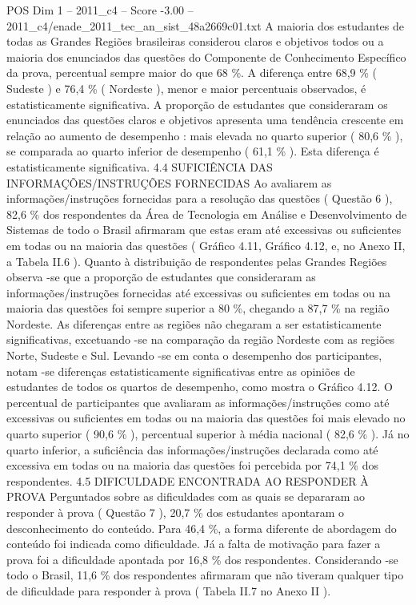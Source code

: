 \begin{textsample}{POS Dim 1 – 2011\_c4 – Score -3.00 – 2011\_c4/enade\_2011\_tec\_an\_sist\_48a2669c01.txt}
A maioria dos estudantes de todas as Grandes Regiões brasileiras considerou claros e objetivos todos ou a maioria dos enunciados das questões do Componente de Conhecimento Específico da prova, percentual sempre maior do que 68 \%.
A diferença entre 68,9 \% ( Sudeste ) e 76,4 \% ( Nordeste ), menor e maior percentuais observados, é estatisticamente significativa.
A proporção de estudantes que consideraram os enunciados das questões claros e objetivos apresenta uma tendência crescente em relação ao aumento de desempenho : mais elevada no quarto superior ( 80,6 \% ), se comparada ao quarto inferior de desempenho ( 61,1 \% ).
Esta diferença é estatisticamente significativa. 4.4 SUFICIÊNCIA DAS INFORMAÇÕES/INSTRUÇÕES FORNECIDAS Ao avaliarem as informações/instruções fornecidas para a resolução das questões ( Questão 6 ), 82,6 \% dos respondentes da Área de Tecnologia em Análise e Desenvolvimento de Sistemas de todo o Brasil afirmaram que estas eram até excessivas ou suficientes em todas ou na maioria das questões ( Gráfico 4.11, Gráfico 4.12, e, no Anexo II, a Tabela II.6 ).
Quanto à distribuição de respondentes pelas Grandes Regiões observa -se que a proporção de estudantes que consideraram as informações/instruções fornecidas até excessivas ou suficientes em todas ou na maioria das questões foi sempre superior a 80 \%, chegando a 87,7 \% na região Nordeste.
As diferenças entre as regiões não chegaram a ser estatisticamente significativas, excetuando -se na comparação da região Nordeste com as regiões Norte, Sudeste e Sul.
Levando -se em conta o desempenho dos participantes, notam -se diferenças estatisticamente significativas entre as opiniões de estudantes de todos os quartos de desempenho, como mostra o Gráfico 4.12.
O percentual de participantes que avaliaram as informações/instruções como até excessivas ou suficientes em todas ou na maioria das questões foi mais elevado no quarto superior ( 90,6 \% ), percentual superior à média nacional ( 82,6 \% ).
Já no quarto inferior, a suficiência das informações/instruções declarada como até excessiva em todas ou na maioria das questões foi percebida por 74,1 \% dos respondentes. 4.5 DIFICULDADE ENCONTRADA AO RESPONDER À PROVA Perguntados sobre as dificuldades com as quais se depararam ao responder à prova ( Questão 7 ), 20,7 \% dos estudantes apontaram o desconhecimento do conteúdo.
Para 46,4 \%, a forma diferente de abordagem do conteúdo foi indicada como dificuldade.
Já a falta de motivação para fazer a prova foi a dificuldade apontada por 16,8 \% dos respondentes.
Considerando -se todo o Brasil, 11,6 \% dos respondentes afirmaram que não tiveram qualquer tipo de dificuldade para responder à prova ( Tabela II.7 no Anexo II ).

\end{textsample}
